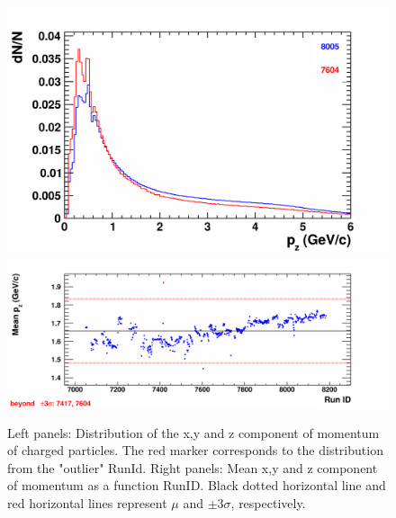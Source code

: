 \begin{figure}[H]
\begin{center}
            \includegraphics[width=0.35\linewidth]{../pict/QA_RunByRun_24.12/H1/nVtxTr_h2_RunId_tr_pz.png}
            \includegraphics[width=0.60\linewidth]{../pict/QA_RunByRun_24.12/nVtxTr_h2_RunId_tr_pz.png}
            \vspace{-3mm}
            \caption{Left panels: Distribution of the x,y and z component of momentum of charged particles. The red marker corresponds to the distribution from the "outlier" RunId. Right panels: Mean x,y and z component of momentum as a function RunID. Black dotted horizontal line and red horizontal lines represent $\mu$ and $\pm3\sigma$, respectively.}
        \end{center}
        \label{Momentum}
        \vspace{-5mm}
    \end{figure}

